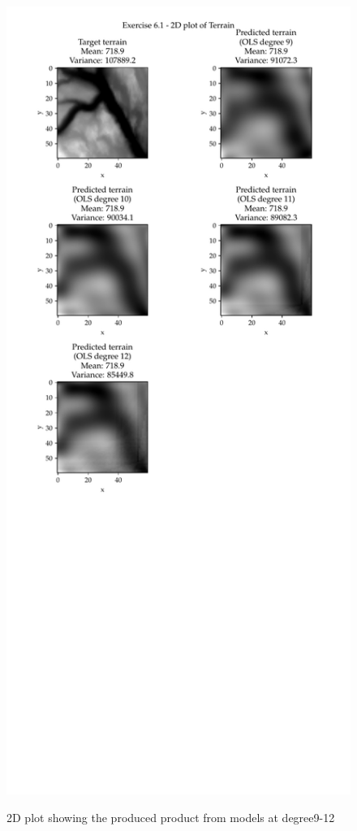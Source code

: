 \documentclass[11pt, a4paper]{article}
\begin{document}
\begin{figure}
  \centering
  \caption{2D plot showing the produced product from models at degree9-12}
  \hspace*{-1.2cm}
  \includegraphics[scale=0.95]{figures/EX6_EX1_target_terrain_and_OLS_prediction_2D.pdf}
  \label{fig:EX6_1_OLS_2D}
\end{figure}
\end{document}
